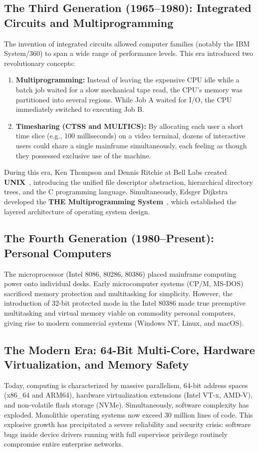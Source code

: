 \subsection{The Third Generation (1965--1980): Integrated Circuits and Multiprogramming}
The invention of integrated circuits allowed computer families (notably the IBM System/360) to span a wide range of performance levels. This era introduced two revolutionary concepts:
\begin{enumerate}
    \item \textbf{Multiprogramming:} Instead of leaving the expensive CPU idle while a batch job waited for a slow mechanical tape read, the CPU's memory was partitioned into several regions. While Job A waited for I/O, the CPU immediately switched to executing Job B.
    \item \textbf{Timesharing (CTSS and MULTICS):} By allocating each user a short time slice (e.g., 100 milliseconds) on a video terminal, dozens of interactive users could share a single mainframe simultaneously, each feeling as though they possessed exclusive use of the machine.
\end{enumerate}

During this era, Ken Thompson and Dennis Ritchie at Bell Labs created \textbf{UNIX}~\cite{ritchie1974unix}, introducing the unified file descriptor abstraction, hierarchical directory trees, and the C programming language. Simultaneously, Edsger Dijkstra developed the \textbf{THE Multiprogramming System}~\cite{dijkstra1968structure}, which established the layered architecture of operating system design.

\subsection{The Fourth Generation (1980--Present): Personal Computers}
The microprocessor (Intel 8086, 80286, 80386) placed mainframe computing power onto individual desks. Early microcomputer systems (CP/M, MS-DOS) sacrificed memory protection and multitasking for simplicity. However, the introduction of 32-bit protected mode in the Intel 80386 made true preemptive multitasking and virtual memory viable on commodity personal computers, giving rise to modern commercial systems (Windows NT, Linux, and macOS).

\subsection{The Modern Era: 64-Bit Multi-Core, Hardware Virtualization, and Memory Safety}
Today, computing is characterized by massive parallelism, 64-bit address spaces (x86\_64 and ARM64), hardware virtualization extensions (Intel VT-x, AMD-V), and non-volatile flash storage (NVMe). Simultaneously, software complexity has exploded. Monolithic operating systems now exceed 30 million lines of code. This explosive growth has precipitated a severe reliability and security crisis: software bugs inside device drivers running with full supervisor privilege routinely compromise entire enterprise networks.

